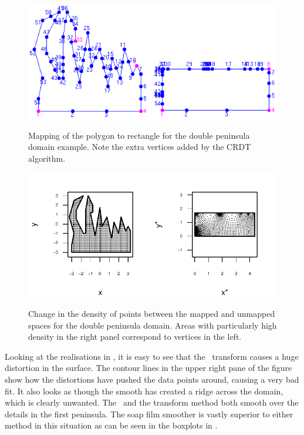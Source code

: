 \begin{figure}
\centering
\includegraphics{sc/figs/wigglytop2-numbered.png} \\
\caption{Mapping of the polygon to rectangle for the double peninsula domain example. Note the extra vertices added by the CRDT algorithm.}
\label{wigglytop2-numbered}
\end{figure}

\begin{figure}
\centering
\includegraphics[width=6in]{sc/figs/wt2-points.pdf} \\
\caption{Change in the density of points between the mapped and unmapped spaces for the double peninsula domain. Areas with particularly high density in the right panel correspond to vertices in the left.}
\label{wt2-points}
\end{figure}

Looking at the realisations in , it is easy to see that the \sch\ transform causes a huge distortion in the surface. The contour lines in the upper right pane of the figure show how the distortions have pushed the data points around, causing a very bad fit. It also looks as though the smooth has created a ridge across the domain, which is clearly unwanted. The \tprs\ and the transform method both smooth over the details in the first peninsula. The soap film smoother is vastly superior to either method in this situation as can be seen in the boxplots in .

